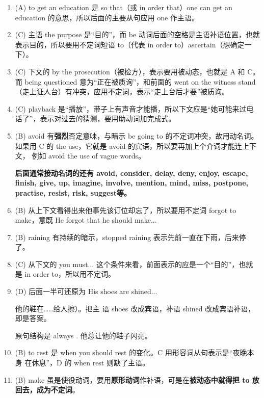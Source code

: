 \begin{enumerate}
\item (A) to get an education 是 so that（或 in order that）one can get an education 的意思，所以后面的主要从句应用 one 作主语。


\item  (C) 主语 the purpose 是“目的”，而 be 动词后面的空格是主语补语位置，也就表示目的，所以要用不定词短语 to（代表 in order to）ascertain（想确定一下）。

\item (C) 下文的 by the prosecution（被检方），表示要用被动态，也就是 A 和 C。而 being questioned 意为“正在被质询”，和前面的 went on the witness stand（走上证人台）有冲突，应用不定词，表示“走上台后才要”被质询。

\item (C) playback 是“播放”，带子上有声音才能播，所以下文应是“她可能来过电话了”，表示对过去的猜测，要用助动词加完成式。

\item (B) avoid 有\textbf{强烈}否定意味，与暗示 be going to 的不定词冲突，故用动名词。
  如果用 C 的 the use，它就是 avoid 的宾语，所以要再加上个介词才能连上下文，
  例如 avoid the use of vague words。

  \textbf{后面通常接动名词的还有 avoid, consider, delay, deny, enjoy, escape,
    finish, give, up, imagine, involve, mention, mind, miss, postpone,
    practise, resist, risk, suggest等。}

\item (B) 从上下文看得出来他事先该订位却忘了，所以要用不定词 forgot to make，意既 He forgot that he should make...



\item (B) raining 有持续的暗示，stopped raining 表示先前一直在下雨，后来停了。

\item (C) 从下文的 you must... 这个条件来看，前面表示的应是一个“目的”，也就
  是 in order to，所以用不定词。

\item (D) 后面一半可还原为 His shoes are shined...

他的鞋在……给人擦）。把主
  语 shoes 改成宾语，补语 shined 改成宾语补语，即是答案。

  原句结构是  always  
  . 他总让他的鞋子闪亮。

\item (B) to rest 是 when you should rest 的变化。C 用形容词从句表示是“夜晚本身
  在休息”，D 的 when rest 则缺了主语。

\item (B) make 虽是使役动词，要用\textbf{原形动词}作补语，可是在\textbf{被动态中就得把 to 放
    回去，成为不定词}。


\end{enumerate}


